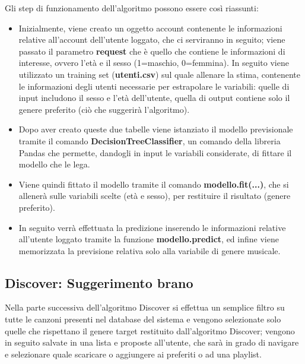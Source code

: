 Gli step di funzionamento dell'algoritmo possono essere così riassunti: 
\begin{itemize}
    \item Inizialmente, viene creato un oggetto account contenente le informazioni relative all'account dell'utente loggato, che ci serviranno in seguito; 
    viene passato il parametro \textbf{request} che è quello che contiene le informazioni di interesse, ovvero l'età e il sesso (1=maschio, 0=femmina). 
    In seguito viene utilizzato un training set (\textbf{utenti.csv}) sul quale allenare la stima, contenente le informazioni degli utenti 
    necessarie per estrapolare le variabili: quelle di input includono il sesso e l'età dell'utente, quella di output contiene solo 
    il genere preferito (ciò che suggerirà l'algoritmo). 

    \item Dopo aver creato queste due tabelle viene istanziato il modello previsionale tramite il comando \textbf{DecisionTreeClassifier}, un comando 
    della libreria Pandas che permette, dandogli in input le variabili considerate, di fittare il modello che le lega. 
    
    \item Viene quindi fittato il modello tramite il comando \textbf{modello.fit(...)}, che si allenerà sulle variabili scelte (età e sesso), per restituire 
    il risultato (genere preferito). 

    \item In seguito verrà effettuata la predizione inserendo le informazioni relative all'utente loggato tramite la funzione \textbf{modello.predict}, ed 
    infine viene memorizzata la previsione relativa solo alla variabile di genere musicale. 
    
\end{itemize}

\vspace{1cm}
\subsection{Discover: Suggerimento brano}
Nella parte successiva dell'algoritmo Discover si effettua un semplice filtro su tutte le canzoni presenti nel database del sistema e vengono
 selezionate solo quelle che rispettano il genere target restituito dall'algoritmo Discover; vengono in seguito salvate in una 
 lista e proposte all'utente, che sarà in grado di navigare e selezionare quale scaricare o aggiungere ai preferiti o ad una playlist. 

